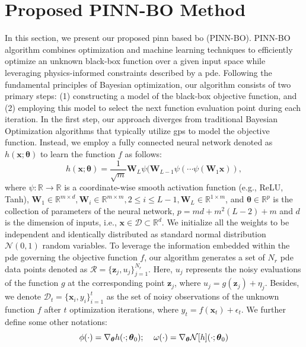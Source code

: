 \section{Proposed PINN-BO Method}
In this section, we present our proposed \ac{pinn} based \acl{bo} (PINN-BO). PINN-BO algorithm combines optimization and machine learning techniques to efficiently optimize an unknown black-box function over a given input space while leveraging physics-informed constraints described by a \ac{pde}. Following the fundamental principles of Bayesian optimization, our algorithm consists of two primary steps: (1) constructing a model of the black-box objective function, and (2) employing this model to select the next function evaluation point during each iteration. In the first step, our approach diverges from traditional Bayesian Optimization algorithms that typically utilize \acfp{gp} to model the objective function. Instead, we employ a fully connected neural network denoted as $h(\mathbf{x}; \boldsymbol{\theta})$ to learn the function $f$ as follows:
\[
h(\mathbf{x};\boldsymbol{\theta}) = \frac{1}{\sqrt{m}} \mathbf{W}_L \psi(\mathbf{W}_{L-1}\psi(\cdots \psi(\mathbf{W}_1 \mathbf{x})),
\]
where $\psi\colon \mathbb{R} \rightarrow \mathbb{R}$ is a coordinate-wise smooth activation function (e.g., ReLU, Tanh), $\mathbf{W}_1 \in \mathbb{R}^{m \times d}, \mathbf{W}_i \in \mathbb{R}^{m \times m}, 2\leq i \leq L-1, \mathbf{W}_L \in \mathbb{R}^{1 \times m}$, and $\boldsymbol{\theta} \in \mathbb{R}^p$ is the collection of parameters of the neural network, $p=md+m^2(L-2)+m$ and $d$ is the dimension of inputs, i.e., $\mathbf{x} \in \mathcal{D} \subset \mathbb{R}^d$. We initialize all the weights to be independent and identically distributed as standard normal distribution $\mathcal{N}(0,1)$ random variables. To leverage the information embedded within the \ac{pde} governing the objective function $f$, our algorithm generates a set of $N_r$ \ac{pde} data points denoted as $\mathcal{R} =  \{\mathbf{z}_j, u_j\}_{j=1}^{N_r}$. Here, $u_j$ represents the noisy evaluations of the function $g$ at the corresponding point $\mathbf{z}_j$, where $u_j = g(\mathbf{z}_j) + \eta_j$. Besides, we denote $\mathcal{D}_t = \{\mathbf{x}_i, y_i\}_{i=1}^t$ as the set of noisy observations of the unknown function $f$ after $t$ optimization iterations, where $y_t = f(\mathbf{x}_t) + \epsilon_t$. We further define some other notations:
\begin{equation*}
        \phi(\cdot) = \nabla_{\boldsymbol{\theta}} h(\cdot; \boldsymbol{\theta}_0) ; \; \; \; \;
        \omega(\cdot)  = \nabla_{\boldsymbol{\theta}} \mathcal{N}[h] (\cdot; \boldsymbol{\theta}_0)\\
\end{equation*}
